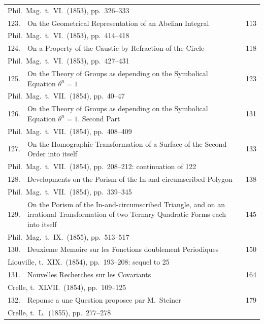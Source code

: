 \documentclass[11pt,a4paper]{article}
\theoremstyle{plain}
\begin{document}
\begin{longtable}{rp{8cm}l}
\multicolumn{3}{l}{\small Phil.\ Mag.\ t.\ VI.\ (1853), pp.\ 326--333}\\[0.5em]
123. & On the Geometrical Representation of an Abelian Integral & 113\\
\multicolumn{3}{l}{\small Phil.\ Mag.\ t.\ VI.\ (1853), pp.\ 414--418}\\[0.5em]
124. & On a Property of the Caustic by Refraction of the Circle & 118\\
\multicolumn{3}{l}{\small Phil.\ Mag.\ t.\ VI.\ (1853), pp.\ 427--431}\\[0.5em]
125. & On the Theory of Groups as depending on the Symbolical Equation $\theta^n = 1$ & 123\\
\multicolumn{3}{l}{\small Phil.\ Mag.\ t.\ VII.\ (1854), pp.\ 40--47}\\[0.5em]
126. & On the Theory of Groups as depending on the Symbolical Equation $\theta^n = 1$. Second Part & 131\\
\multicolumn{3}{l}{\small Phil.\ Mag.\ t.\ VII.\ (1854), pp.\ 408--409}\\[0.5em]
127. & On the Homographic Transformation of a Surface of the Second Order into itself & 133\\
\multicolumn{3}{l}{\small Phil.\ Mag.\ t.\ VII.\ (1854), pp.\ 208--212: continuation of 122}\\[0.5em]
128. & Developments on the Porism of the In-and-circumscribed Polygon & 138\\
\multicolumn{3}{l}{\small Phil.\ Mag.\ t.\ VII.\ (1854), pp.\ 339--345}\\[0.5em]
129. & On the Porism of the In-and-circumscribed Triangle, and on an irrational Transformation of two Ternary Quadratic Forms each into itself & 145\\
\multicolumn{3}{l}{\small Phil.\ Mag.\ t.\ IX.\ (1855), pp.\ 513--517}\\[0.5em]
130. & Deuxieme Memoire sur les Fonctions doublement Periodiques & 150\\
\multicolumn{3}{l}{\small Liouville, t.\ XIX.\ (1854), pp.\ 193--208: sequel to 25}\\[0.5em]
131. & Nouvelles Recherches sur les Covariants & 164\\
\multicolumn{3}{l}{\small Crelle, t.\ XLVII.\ (1854), pp.\ 109--125}\\[0.5em]
132. & Reponse a une Question proposee par M.\ Steiner & 179\\
\multicolumn{3}{l}{\small Crelle, t.\ L.\ (1855), pp.\ 277--278}\\[0.5em]

\end{longtable}
\end{document}
